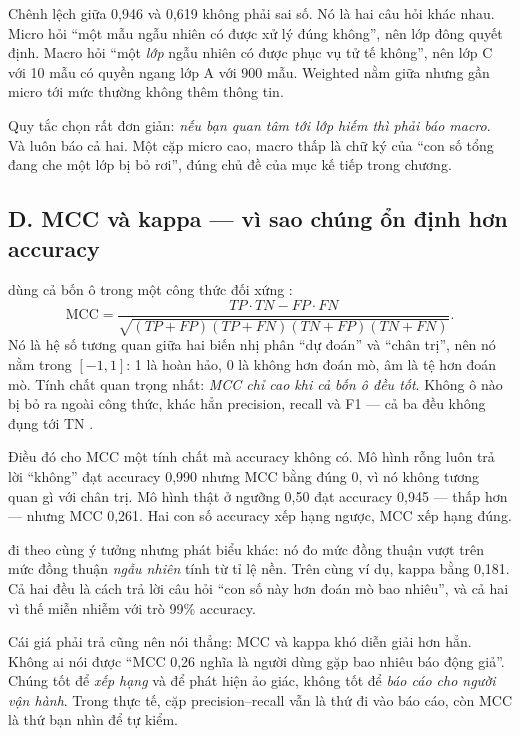 \documentclass[../../deep_learning.tex]{subfiles}
\begin{document}
Chênh lệch giữa 0{,}946 và 0{,}619 không phải sai số. Nó là hai câu hỏi khác nhau. Micro hỏi ``một mẫu ngẫu nhiên có được xử lý đúng không'', nên lớp đông quyết định. Macro hỏi ``một \emph{lớp} ngẫu nhiên có được phục vụ tử tế không'', nên lớp C với 10 mẫu có quyền ngang lớp A với 900 mẫu. Weighted nằm giữa nhưng gần micro tới mức thường không thêm thông tin.

Quy tắc chọn rất đơn giản: \emph{nếu bạn quan tâm tới lớp hiếm thì phải báo macro}. Và luôn báo cả hai. Một cặp micro cao, macro thấp là chữ ký của ``con số tổng đang che một lớp bị bỏ rơi'', đúng chủ đề của mục kế tiếp trong chương.

\subsection{D. MCC và kappa --- vì sao chúng ổn định hơn accuracy}
 dùng cả bốn ô trong một công thức đối xứng \cite{matthews1975comparison}:
\[
\text{MCC} = \frac{TP\cdot TN - FP\cdot FN}{\sqrt{(TP{+}FP)(TP{+}FN)(TN{+}FP)(TN{+}FN)}}.
\]
Nó là hệ số tương quan giữa hai biến nhị phân ``dự đoán'' và ``chân trị'', nên nó nằm trong \([-1,1]\): 1 là hoàn hảo, 0 là không hơn đoán mò, âm là tệ hơn đoán mò. Tính chất quan trọng nhất: \emph{MCC chỉ cao khi cả bốn ô đều tốt}. Không ô nào bị bỏ ra ngoài công thức, khác hẳn precision, recall và F1 --- cả ba đều không đụng tới TN \cite{chicco2020mcc}.

Điều đó cho MCC một tính chất mà accuracy không có. Mô hình rỗng luôn trả lời ``không'' đạt accuracy 0{,}990 nhưng MCC bằng đúng 0, vì nó không tương quan gì với chân trị. Mô hình thật ở ngưỡng 0{,}50 đạt accuracy 0{,}945 --- thấp hơn --- nhưng MCC 0{,}261. Hai con số accuracy xếp hạng ngược, MCC xếp hạng đúng.

 \cite{cohen1960kappa} đi theo cùng ý tưởng nhưng phát biểu khác: nó đo mức đồng thuận vượt trên mức đồng thuận \emph{ngẫu nhiên} tính từ tỉ lệ nền. Trên cùng ví dụ, kappa bằng 0{,}181. Cả hai đều là cách trả lời câu hỏi ``con số này hơn đoán mò bao nhiêu'', và cả hai vì thế miễn nhiễm với trò 99\% accuracy.

Cái giá phải trả cũng nên nói thẳng: MCC và kappa khó diễn giải hơn hẳn. Không ai nói được ``MCC 0{,}26 nghĩa là người dùng gặp bao nhiêu báo động giả''. Chúng tốt để \emph{xếp hạng} và để phát hiện ảo giác, không tốt để \emph{báo cáo cho người vận hành}. Trong thực tế, cặp precision--recall vẫn là thứ đi vào báo cáo, còn MCC là thứ bạn nhìn để tự kiểm.
\end{document}
